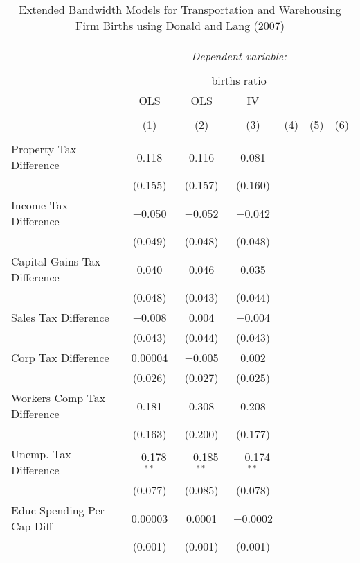 
\begin{table}[!htbp] \centering 
  \caption{Extended Bandwidth Models for  Transportation and Warehousing Firm Births using Donald and Lang (2007)} 
  \label{} 
\begin{tabular}{@{\extracolsep{5pt}}lcccccc} 
\\[-1.8ex]\hline 
\hline \\[-1.8ex] 
 & \multicolumn{6}{c}{\textit{Dependent variable:}} \\ 
\cline{2-7} 
\\[-1.8ex] & \multicolumn{6}{c}{births ratio} \\ 
 & OLS & OLS & IV &  &  &  \\ 
\\[-1.8ex] & (1) & (2) & (3) & (4) & (5) & (6)\\ 
\hline \\[-1.8ex] 
 Property Tax Difference & 0.118 & 0.116 & 0.081 &  &  &  \\ 
  & (0.155) & (0.157) & (0.160) &  &  &  \\ 
  Income Tax Difference & $-$0.050 & $-$0.052 & $-$0.042 &  &  &  \\ 
  & (0.049) & (0.048) & (0.048) &  &  &  \\ 
  Capital Gains Tax Difference & 0.040 & 0.046 & 0.035 &  &  &  \\ 
  & (0.048) & (0.043) & (0.044) &  &  &  \\ 
  Sales Tax Difference & $-$0.008 & 0.004 & $-$0.004 &  &  &  \\ 
  & (0.043) & (0.044) & (0.043) &  &  &  \\ 
  Corp Tax Difference & 0.00004 & $-$0.005 & 0.002 &  &  &  \\ 
  & (0.026) & (0.027) & (0.025) &  &  &  \\ 
  Workers Comp Tax Difference & 0.181 & 0.308 & 0.208 &  &  &  \\ 
  & (0.163) & (0.200) & (0.177) &  &  &  \\ 
  Unemp. Tax Difference & $-$0.178$^{**}$ & $-$0.185$^{**}$ & $-$0.174$^{**}$ &  &  &  \\ 
  & (0.077) & (0.085) & (0.078) &  &  &  \\ 
  Educ Spending Per Cap Diff & 0.00003 & 0.0001 & $-$0.0002 &  &  &  \\ 
  & (0.001) & (0.001) & (0.001) &  &  &  \\ 

\end{tabular}
\end{table}
